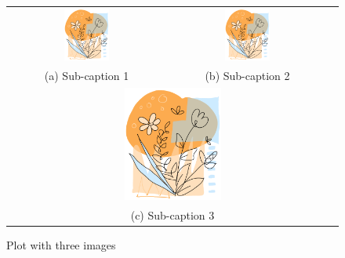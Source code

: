 \begin{figure}[ht]
\centering
\begin{tabular}{ccc}
\includegraphics[width=0.3\textwidth]{Chapters/Chapter_2/figures/image1.png} & \includegraphics[width=0.3\textwidth]{Chapters/Chapter_2/figures/image2.png} & \\
(a) Sub-caption 1 & (b) Sub-caption 2 & \\
\multicolumn{3}{c}{\includegraphics[width=0.3\textwidth]{Chapters/Chapter_2/figures/image1.png}} \\
\multicolumn{3}{c}{(c) Sub-caption 3} \\
\end{tabular}
\caption{Plot with three images}
\label{fig:figure2_3}
\end{figure}